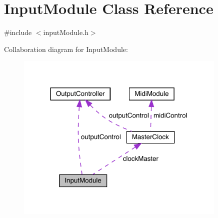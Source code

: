 \hypertarget{class_input_module}{}\section{Input\+Module Class Reference}
\label{class_input_module}


{\ttfamily \#include $<$input\+Module.\+h$>$}



Collaboration diagram for Input\+Module\+:
\nopagebreak
\begin{figure}[H]
\begin{center}
\leavevmode
\includegraphics[width=285pt]{class_input_module__coll__graph}
\end{center}
\end{figure}
